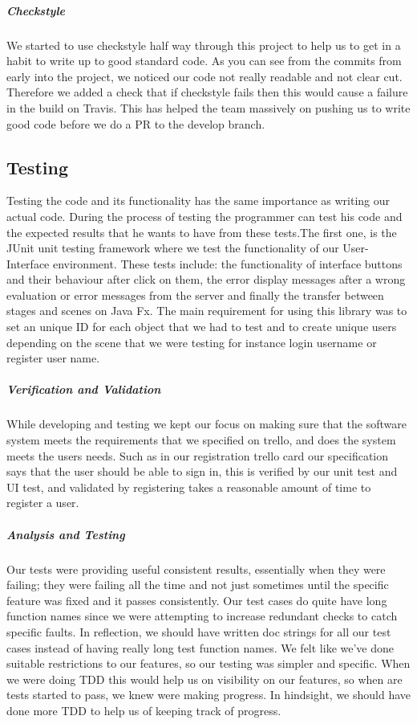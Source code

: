 \documentclass[11pt,a4paper]{report}
\begin{document}
\subparagraph{Checkstyle}
We started to use checkstyle half way through this project to help us to get in a habit to write up to good standard code. As you can see from the commits from early into the project, we noticed our code not really readable and not clear cut. Therefore we added a check that if checkstyle fails then this would cause a failure in the build on Travis. This has helped the team massively on pushing us to write good code before we do a PR to the develop branch.

\subsection{Testing}
Testing the code and its functionality has the same importance as writing our actual code. During the process of testing the programmer can test his code and the expected results that he wants to have from these tests.The first one, is the JUnit unit testing framework where we test the functionality of our User-Interface environment. These tests include: the functionality of interface buttons and their behaviour after click on them, the error display messages after a wrong evaluation or error messages from the server and finally the transfer between stages and scenes on Java Fx. The main requirement for using this library was to set an unique ID for each object that we had to test and to create unique users depending on the scene that we were testing for instance login username or register user name.

\subparagraph{Verification and Validation}
While developing and testing we kept our focus on making sure that the software system meets the requirements that we specified on trello, and does the system meets the users needs. Such as in our registration trello card our specification says that the user should be able to sign in, this is verified by our unit test and UI test, and validated by registering takes a reasonable amount of time to register a user.

\subparagraph{Analysis and Testing}
Our tests were providing useful consistent results, essentially when they were failing; they were failing all the time and not just sometimes until the specific feature was fixed and it passes consistently. Our test cases do quite have long function names since we were attempting to increase redundant checks to catch specific faults. In reflection, we should have written doc strings for all our test cases instead of having really long test function names. We felt like we’ve done suitable restrictions to our features, so our testing was simpler and specific. When we were doing TDD this would help us on visibility on our features, so when are tests started to pass, we knew were making progress. In hindsight, we should have done more TDD to help us of keeping track of progress.
\end{document}
